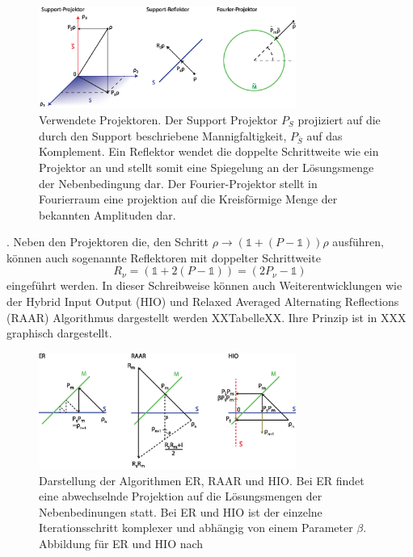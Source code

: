 	\begin{figure}
		\centering
		\includegraphics[width=0.75\textwidth]{images/projektor.eps}
		\caption[Abbildungstext im Abbildungsverzeichnis]{Verwendete Projektoren. Der Support Projektor $P_S$ projiziert auf die durch den Support beschriebene Mannigfaltigkeit, $P_{\bar{S}}$ auf das Komplement. Ein Reflektor wendet die doppelte Schrittweite wie ein Projektor an und stellt somit eine Spiegelung an der Lösungsmenge der Nebenbedingung dar. Der Fourier-Projektor stellt in Fourierraum eine projektion auf die Kreisförmige Menge der bekannten Amplituden dar.}
		\label{fig:projektoren}
	\end{figure}.
	Neben den Projektoren die, den Schritt $\rho\rightarrow (\mathbb{1}+(P-\mathbb{1}))\rho$ ausführen, können auch sogenannte Reflektoren mit doppelter Schrittweite
	\begin{equation}
	R_\nu= (\mathbb{1}+2(P-\mathbb{1}))=(2P_\nu-\mathbb{1})
	\end{equation}
	eingeführt werden.
In dieser Schreibweise können auch Weiterentwicklungen wie der Hybrid Input Output (HIO) und Relaxed Averaged Alternating Reflections (RAAR) Algorithmus dargestellt werden XXTabelleXX. Ihre Prinzip ist in XXX graphisch dargestellt.
	\begin{figure}
		\centering
		\includegraphics[width=0.75\textwidth]{images/algorithmen.eps}
		\caption[Abbildungstext im Abbildungsverzeichnis]{Darstellung der Algorithmen ER, RAAR und HIO. Bei ER findet eine abwechselnde Projektion auf die Lösungsmengen der Nebenbedinungen statt. Bei ER und HIO ist der einzelne Iterationsschritt komplexer und abhängig von einem Parameter $\beta$. Abbildung für ER und HIO nach \cite{XX}}
		\label{Abb:BspAbbildung}
	\end{figure} 
